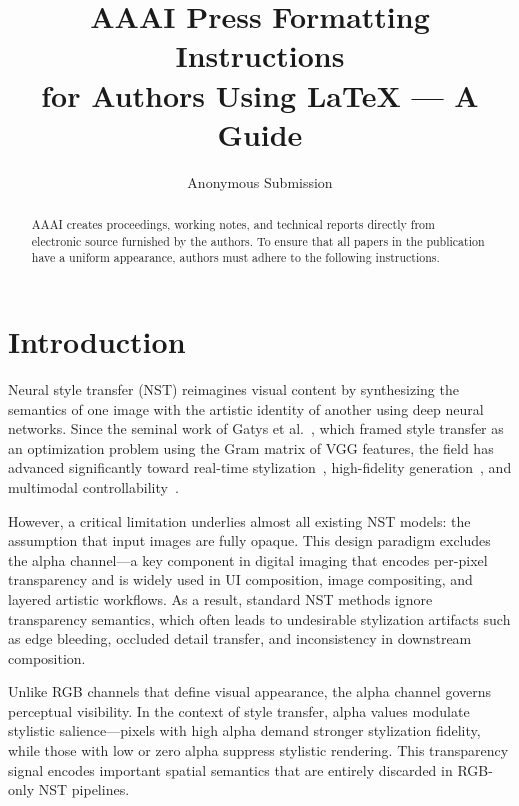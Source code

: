 \documentclass[letterpaper]{article} %
\title{AAAI Press Formatting Instructions \\for Authors Using \LaTeX{} --- A Guide}
\author{
    Anonymous Submission
}
\begin{document}
\maketitle

\begin{abstract}
AAAI creates proceedings, working notes, and technical reports directly from electronic source furnished by the authors. To ensure that all papers in the publication have a uniform appearance, authors must adhere to the following instructions.
\end{abstract}


\section{Introduction}

Neural style transfer (NST) reimagines visual content by synthesizing the semantics of one image with the artistic identity of another using deep neural networks. 
Since the seminal work of Gatys et al.~\cite{gatys2016image}, which framed style transfer as an optimization problem using the Gram matrix of VGG features, the field has advanced significantly toward real-time stylization~\cite{huang2017arbitrary}, high-fidelity generation~\cite{kwon2024aesfa}, and multimodal controllability~\cite{ahn2024dreamstyler}.

However, a critical limitation underlies almost all existing NST models: the assumption that input images are fully opaque. This design paradigm excludes the alpha channel—a key component in digital imaging that encodes per-pixel transparency and is widely used in UI composition, image compositing, and layered artistic workflows. As a result, standard NST methods ignore transparency semantics, which often leads to undesirable stylization artifacts such as edge bleeding, occluded detail transfer, and inconsistency in downstream composition.

Unlike RGB channels that define visual appearance, the alpha channel governs perceptual visibility. In the context of style transfer, alpha values modulate stylistic salience—pixels with high alpha demand stronger stylization fidelity, while those with low or zero alpha suppress stylistic rendering. This transparency signal encodes important spatial semantics that are entirely discarded in RGB-only NST pipelines.
\end{document}

